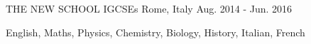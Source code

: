 \begin{cventries}
    \cventry
    {THE NEW SCHOOL} %
    {IGCSEs} %
    {Rome, Italy} %
    {Aug. 2014 - Jun. 2016} %
    {
      \begin{cvitems} %
        \item {English, Maths, Physics, Chemistry, Biology, History, Italian, French}
      \end{cvitems}
    }
\end{cventries}
